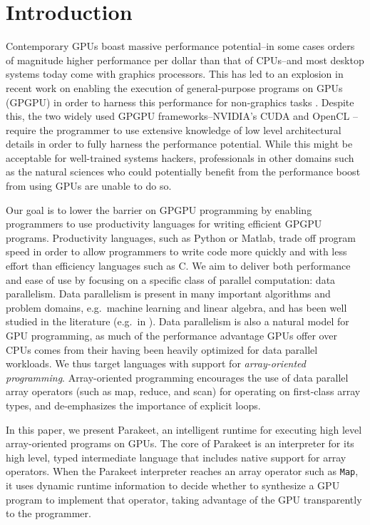 \documentclass[preprint]{sigplanconf}
\begin{document}
\section{Introduction}

Contemporary GPUs boast massive performance potential--in some cases orders of
magnitude higher performance per dollar than that of CPUs--and most desktop
systems today come with graphics processors.  This has led to an explosion in
recent work on enabling the execution of general-purpose programs on GPUs
(GPGPU) in order to harness this performance for non-graphics tasks
\cite{Cata10,Main10,Muns10,NvidCU,Sven08,Tard06}. Despite this, the two widely
used GPGPU frameworks--NVIDIA's CUDA \cite{NvidCU} and OpenCL
\cite{Muns10}--require the programmer to use extensive knowledge of low level
architectural details in order to fully harness the performance potential.
While this might be acceptable for well-trained systems hackers, professionals
in other domains such as the natural sciences who could potentially
benefit from the performance boost from using GPUs are unable to do so.

Our goal is to lower the barrier on GPGPU programming by
enabling programmers to use productivity languages for writing
efficient GPGPU programs. Productivity languages, such as Python or Matlab,
trade off program speed in order to allow programmers to write code more quickly
and with less effort than efficiency languages such as C.  We aim to deliver
both performance and ease of use by focusing on a specific class of parallel
computation: data parallelism.  Data parallelism is present in many important
algorithms and problem domains, e.g.\ machine learning and linear algebra, and
has been well studied in the literature (e.g.\ in \cite{Blel90}).  Data
parallelism is also a natural
model for GPU programming, as much of the performance advantage GPUs offer over
CPUs comes from their having been heavily optimized for data parallel workloads.
 We thus target languages with support for \emph{array-oriented programming}.
Array-oriented programming encourages the use of data parallel array operators
(such as map, reduce, and scan) for operating on first-class array types, and
de-emphasizes the importance of explicit loops.

In this paper, we present Parakeet, an intelligent runtime for executing high
level array-oriented programs on GPUs.  The core of Parakeet is an interpreter
for its high level, typed intermediate language that includes native support for
array operators.  When the Parakeet interpreter reaches an array operator such
as {\tt Map}, it uses dynamic runtime information to decide whether to
synthesize a GPU program to implement that operator, taking advantage of the
GPU transparently to the programmer.
\end{document}
